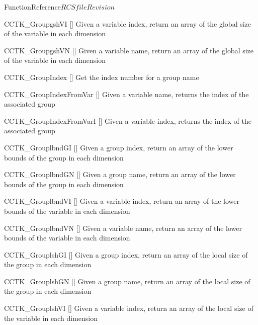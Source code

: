 \begin{cactuspart}{FunctionReference}{$RCSfile$}{$Revision$}
\begin{Lentry}
\item[CCTK\_GroupgshVI] [\pageref{CCTK-GroupgshVI}]
  Given a variable index, return an array of the global size of the variable in each dimension

\item[CCTK\_GroupgshVN] [\pageref{CCTK-GroupgshVN}]
  Given a variable name, return an array of the global size of the variable in each dimension

\item[CCTK\_GroupIndex]
  [\pageref{CCTK-GroupIndex}]
  Get the index number for a group name

\item[CCTK\_GroupIndexFromVar]
  [\pageref{CCTK-GroupIndexFromVar}]
  Given a variable name, returns the index of the associated group

\item[CCTK\_GroupIndexFromVarI]
  [\pageref{CCTK-GroupIndexFromVarI}]
  Given a variable index, returns the index of the associated group

\item[CCTK\_GrouplbndGI] [\pageref{CCTK-GrouplbndGI}]
  Given a group index, return an array of the lower bounds of the group in each dimension

\item[CCTK\_GrouplbndGN] [\pageref{CCTK-GrouplbndGN}]
  Given a group name, return an array of the lower bounds of the group in each dimension

\item[CCTK\_GrouplbndVI] [\pageref{CCTK-GrouplbndVI}]
  Given a variable index, return an array of the lower bounds of the variable in each dimension

\item[CCTK\_GrouplbndVN] [\pageref{CCTK-GrouplbndVN}]
  Given a variable name, return an array of the lower bounds of the variable in each dimension

\item[CCTK\_GrouplshGI] [\pageref{CCTK-GrouplshGI}]
  Given a group index, return an array of the local size of the group in each dimension

\item[CCTK\_GrouplshGN] [\pageref{CCTK-GrouplshGN}]
  Given a group name, return an array of the local size of the group in each dimension

\item[CCTK\_GrouplshVI] [\pageref{CCTK-GrouplshVI}]
  Given a variable index, return an array of the local size of the variable in each dimension


\end{Lentry}
\end{cactuspart}
